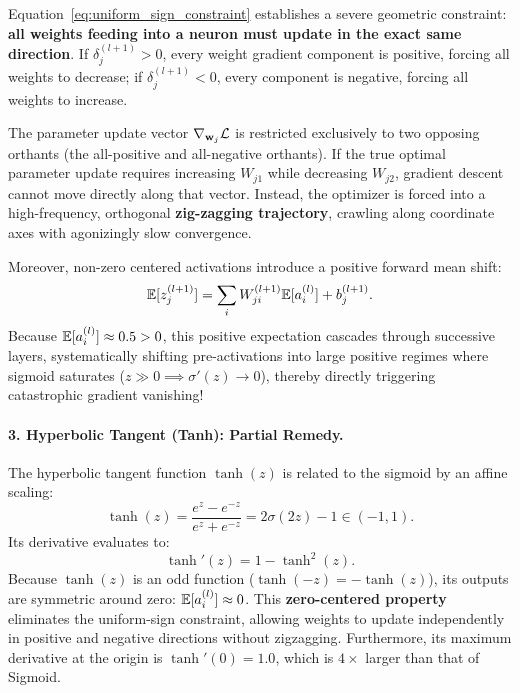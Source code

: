 \begin{examinsight}
Equation~\eqref{eq:uniform_sign_constraint} establishes a severe geometric constraint: \textbf{all weights feeding into a neuron must update in the exact same direction}. If $\delta_j^{(l+1)} > 0$, every weight gradient component is positive, forcing all weights to decrease; if $\delta_j^{(l+1)} < 0$, every component is negative, forcing all weights to increase. 

The parameter update vector $\nabla_{\mathbf{w}_j} \mathcal{L}$ is restricted exclusively to two opposing orthants (the all-positive and all-negative orthants). If the true optimal parameter update requires increasing $W_{j1}$ while decreasing $W_{j2}$, gradient descent cannot move directly along that vector. Instead, the optimizer is forced into a high-frequency, orthogonal \textbf{zig-zagging trajectory}, crawling along coordinate axes with agonizingly slow convergence.

Moreover, non-zero centered activations introduce a positive forward mean shift:
\begin{equation}
\mathbb{E}[z_j^{(l+1)}] = \sum_{i} W_{ji}^{(l+1)} \mathbb{E}[a_i^{(l)}] + b_j^{(l+1)}.
\end{equation}
Because $\mathbb{E}[a_i^{(l)}] \approx 0.5 > 0$, this positive expectation cascades through successive layers, systematically shifting pre-activations into large positive regimes where sigmoid saturates ($z \gg 0 \implies \sigma'(z) \to 0$), thereby directly triggering catastrophic gradient vanishing!
\end{examinsight}

\paragraph{3. Hyperbolic Tangent (Tanh): Partial Remedy.}
The hyperbolic tangent function $\tanh(z)$ is related to the sigmoid by an affine scaling:
\begin{equation}
\tanh(z) = \frac{e^z - e^{-z}}{e^z + e^{-z}} = 2\sigma(2z) - 1 \in (-1, 1).
\label{eq:tanh_definition}
\end{equation}
Its derivative evaluates to:
\begin{equation}
\tanh'(z) = 1 - \tanh^2(z).
\label{eq:tanh_derivative}
\end{equation}
Because $\tanh(z)$ is an odd function ($\tanh(-z) = -\tanh(z)$), its outputs are symmetric around zero: $\mathbb{E}[a_i^{(l)}] \approx 0$. This \textbf{zero-centered property} eliminates the uniform-sign constraint, allowing weights to update independently in positive and negative directions without zigzagging. Furthermore, its maximum derivative at the origin is $\tanh'(0) = 1.0$, which is $4\times$ larger than that of Sigmoid.

